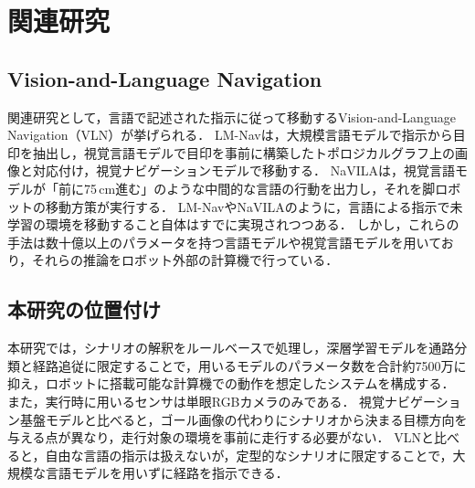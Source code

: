 \section{関連研究}
\label{sec:related}


\subsection{Vision-and-Language Navigation}
\label{sec:related_vln}

関連研究として，言語で記述された指示に従って移動するVision-and-Language Navigation（VLN）が挙げられる．
LM-Navは，大規模言語モデルで指示から目印を抽出し，視覚言語モデルで目印を事前に構築したトポロジカルグラフ上の画像と対応付け，視覚ナビゲーションモデルで移動する\cite{lmnav}．
NaVILAは，視覚言語モデルが「前に75\,cm進む」のような中間的な言語の行動を出力し，それを脚ロボットの移動方策が実行する\cite{navila}．
LM-Nav\cite{lmnav}やNaVILA\cite{navila}のように，言語による指示で未学習の環境を移動すること自体はすでに実現されつつある．
しかし，これらの手法は数十億以上のパラメータを持つ言語モデルや視覚言語モデルを用いており，それらの推論をロボット外部の計算機で行っている\cite{lmnav,navila}．

\subsection{本研究の位置付け}
\label{sec:related_position}

本研究では，シナリオの解釈をルールベースで処理し，深層学習モデルを通路分類と経路追従に限定することで，用いるモデルのパラメータ数を合計約7500万に抑え，ロボットに搭載可能な計算機での動作を想定したシステムを構成する．
また，実行時に用いるセンサは単眼RGBカメラのみである．
視覚ナビゲーション基盤モデルと比べると，ゴール画像の代わりにシナリオから決まる目標方向を与える点が異なり，走行対象の環境を事前に走行する必要がない．
VLNと比べると，自由な言語の指示は扱えないが，定型的なシナリオに限定することで，大規模な言語モデルを用いずに経路を指示できる．
